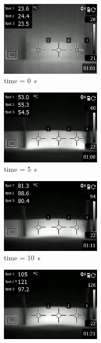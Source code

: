 \documentclass[11pt,review,times]{elsarticle}
\begin{document}
\begin{figure}[htb]
	\center
	\captionsetup{width=125mm}
	
	\begin{subfigure}{55mm}
		\center
		\captionsetup{width=50mm}
		\includegraphics[width=50mm]{Fig3a.png}
		\caption{time = \SI{0}{\s}}
		\label{fig:results_lab_0s}
	\end{subfigure}
	\begin{subfigure}{55mm}
		\center
		\captionsetup{width=50mm}
		\includegraphics[width=50mm]{Fig3b.png}
		\caption{time = \SI{5}{\s}}
		\label{fig:results_lab_5s}
	\end{subfigure}
	\begin{subfigure}{55mm}
		\center
		\captionsetup{width=50mm}
		\includegraphics[width=50mm]{Fig3c.png}
		\caption{time = \SI{10}{\s}}
		\label{fig:results_lab_10s}
	\end{subfigure}
	\begin{subfigure}{55mm}
		\center
		\captionsetup{width=50mm}
		\includegraphics[width=50mm]{Fig3d.png}

\end{subfigure}
\end{figure}
\end{document}
